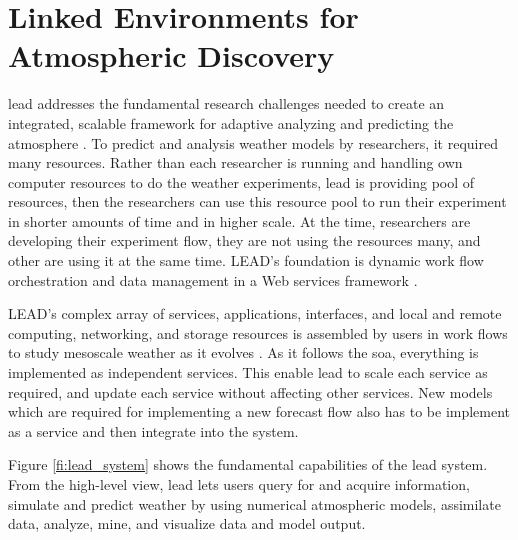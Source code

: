 \section{Linked Environments for Atmospheric Discovery}
\label{se:lead}

\acrfull{lead} addresses the fundamental research challenges needed to create an integrated, scalable framework for adaptive analyzing and predicting the atmosphere \cite{Droegemeier2005Service-OrientedWeather}. To predict and analysis weather models by researchers, it required many resources. Rather than each researcher is running and handling own computer resources to do the weather experiments, \acrshort{lead} is providing pool of resources, then the researchers can use this resource pool to run their experiment in shorter amounts of time and in higher scale. At the time, researchers are developing their experiment flow, they are not using the resources many, and other are using it at the same time. LEAD's foundation is dynamic work flow orchestration and data management in a Web services framework \cite{Droegemeier2005Service-OrientedWeather}.

LEAD's complex array of services, applications, interfaces, and local and remote computing, networking, and storage resources is assembled by users in work flows to study mesoscale weather as it evolves \cite{Droegemeier2005Service-OrientedWeather}. As it follows the \acrshort{soa}, everything is implemented as independent services. This enable \acrshort{lead} to scale each service as required, and update each service without affecting other services. New models which are required for implementing a new forecast flow also has to be implement as a service and then integrate into the system.

Figure \ref{fi:lead_system} shows the fundamental capabilities of the \acrshort{lead} system. From the high-level view, \acrshort{lead} lets users query for and acquire information, simulate and predict weather by using numerical atmospheric models, assimilate data, analyze, mine, and visualize data and model output.

